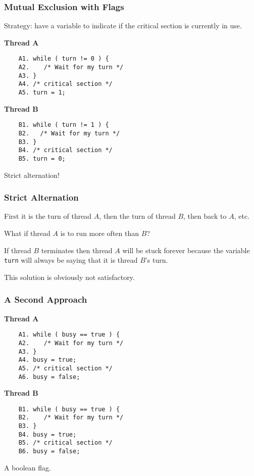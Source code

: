 \begin{frame}[fragile]
\frametitle{Mutual Exclusion with Flags}

Strategy: have a variable to indicate if the critical section is currently in use.

\begin{multicols}{2}
\textbf{Thread A}
	\begin{verbatim}
	A1. while ( turn != 0 ) {
	A2.    /* Wait for my turn */
	A3. }
	A4. /* critical section */
	A5. turn = 1;
	\end{verbatim}
\columnbreak
\textbf{Thread B}
	\begin{verbatim}
	B1. while ( turn != 1 ) {
	B2.   /* Wait for my turn */
	B3. }
	B4. /* critical section */
	B5. turn = 0;
	\end{verbatim}
\end{multicols}

Strict alternation!

\end{frame}

\begin{frame}
\frametitle{Strict Alternation}

First it is the turn of thread $A$, then the turn of thread $B$, then back to $A$, etc. 

What if thread $A$ is to run more often than $B$? 

If thread $B$ terminates then thread $A$ will be stuck forever because the variable \texttt{turn} will always be saying that it is thread $B$'s turn. 

This solution is obviously not satisfactory.

\end{frame}

\begin{frame}[fragile]
\frametitle{A Second Approach}

\begin{multicols}{2}
\textbf{Thread A}
	\begin{verbatim}
	A1. while ( busy == true ) {
	A2.    /* Wait for my turn */
	A3. }
	A4. busy = true;
	A5. /* critical section */
	A6. busy = false;
	\end{verbatim}
\columnbreak
\textbf{Thread B}
	\begin{verbatim}
	B1. while ( busy == true ) {
	B2.    /* Wait for my turn */
	B3. }
	B4. busy = true;
	B5. /* critical section */
	B6. busy = false;
	\end{verbatim}
\end{multicols}

A boolean flag.

\end{frame}

